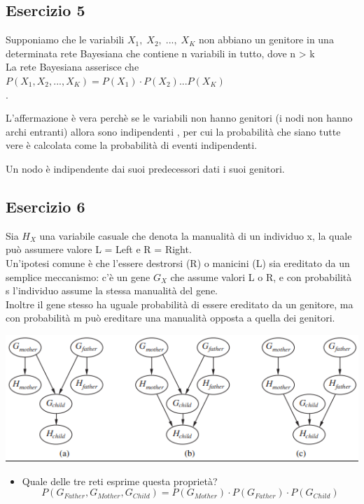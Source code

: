\documentclass{article}
\begin{document}
\pagebreak

\subsection{Esercizio 5}

Supponiamo che le variabili \(X_1, \; X_2, \; ..., \; X_K \) non abbiano un genitore in una determinata rete Bayesiana che contiene n variabili in tutto, dove n > k \\
La rete Bayesiana asserisce che \(P(X_1, X_2, ..., X_K) = P(X_1) \cdot P(X_2) ... P(X_K) \) \\.

L'affermazione è vera perchè se le variabili non hanno genitori (i nodi non hanno archi entranti) allora sono indipendenti , per cui la probabilità che siano tutte vere è calcolata come la probabilità di eventi indipendenti.

Un nodo è indipendente dai suoi predecessori dati i suoi genitori.

\pagebreak

\subsection{Esercizio 6}
Sia \(H_X\) una variabile casuale che denota la manualità di un individuo x, la quale può assumere valore L = Left e R = Right. \\
Un'ipotesi comune è che l'essere destrorsi (R) o manicini (L) sia ereditato da un semplice meccanismo: c'è un gene \(G_X\) che assume valori L o R, e con probabilità s l'individuo assume la stessa manualità del gene. \\
Inoltre il gene stesso ha uguale probabilità di essere ereditato da un genitore, ma con probabilità m può ereditare una manualità opposta a quella dei genitori.


\begin{center}
	\includegraphics{./immagini/eshandedness}
\end{center}

\begin{itemize}
	\item Quale delle tre reti esprime questa proprietà?
	\[ P(G_{Father}, G_{Mother}, G_{Child}) = P(G_{Mother}) \cdot P(G_{Father}) \cdot P(G_{Child})\]
\end{itemize}
\end{document}
